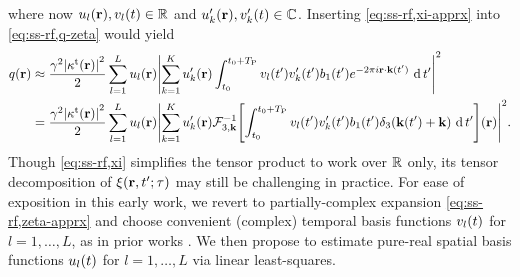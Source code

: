 where now $u_l\pr, v_l\pt \in \real$ 
and $u'_k\pr, v'_k\pt \in \complex$. 
Inserting \eqref{eq:ss-rf,xi-apprx}
into \eqref{eq:ss-rf,q-zeta} would yield
	\begin{align}
		q\pr &\approx 
			\frac{\gam^2 \abs{\stx\pr}^2 }{2} 
			\sum_{l=1}^L u_l\pr \abs{\sum_{k=1}^K u'_k\pr 
			\int_{t_0}^{t_0+\TP} v_l(t') v'_k(t') \bone(t') 
			e^{-2\pi i \bmr \cdot \bmk(t')} \der t'}^2 
			\nonumber 
			\\
		&= 
			\frac{\gam^2 \abs{\stx\pr}^2 }{2} 
			\sum_{l=1}^L u_l\pr \abs{\sum_{k=1}^K u'_k\pr 
			\mathcal{F}^{-1}_{3,\bmk} \brac{\int_{t_0}^{t_0+\TP} v_l(t') v'_k(t') 
			\bone(t') \delta_3(\bmk(t') + \bmk) \der t'} \paren{\bmr}}^2. 
			\label{eq:ss-rf,q-apprx,alt}
	\end{align}
Though \eqref{eq:ss-rf,xi} simplifies the tensor product to work over $\mathbb{R}$ only, 
its tensor decomposition of $\xi(\mathbf{r}, t'; \tau)$
may still be challenging in practice.
For ease of exposition 
in this early work, 
we revert to partially-complex expansion \eqref{eq:ss-rf,zeta-apprx} 
and choose convenient (complex) temporal basis functions 
$v_l\pt$ for $l = 1, \dots, L$, 
as in prior works \cite{noll:91:ahc,sutton:03:fii}. 
We then propose to estimate pure-real spatial basis functions 
$u_l\pt$ for $l = 1, \dots, L$ 
via linear least-squares.

